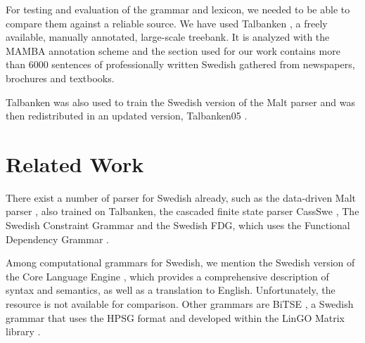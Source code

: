 \documentclass[runningheads,a4paper]{llncs}
\begin{document}
\label{sec:talbanken}
For testing and evaluation of the grammar and lexicon, we needed to be able to
compare them against a reliable source.
We have used Talbanken \cite{talbanken},
a freely available, manually annotated, large-scale treebank.
It is analyzed with the MAMBA annotation scheme and the section used for our
work contains more than 6000 sentences
of professionally written Swedish gathered from newspapers, brochures and textbooks.

Talbanken was also used to train the Swedish version of the Malt parser \cite{malt}
and was then redistributed in an updated version,
Talbanken05 \cite{talbanken05}.



 
\section{Related Work}
%
There exist a number of parser for Swedish already, such as the
data-driven Malt parser \cite{malt}, also trained on Talbanken, the 
cascaded finite state parser CassSwe \cite{casswe}, %
The Swedish Constraint Grammar \cite{birn} and the Swedish FDG, which
uses the Functional Dependency Grammar \cite{fdg}.

Among computational grammars for Swedish, we mention the Swedish
version of the Core Language Engine \cite{gamback}, which
provides a comprehensive description of syntax and semantics, as well
as a translation to English. Unfortunately, the resource is not
available for comparison. Other grammars are BiTSE \cite{stymne}, a
Swedish grammar that uses the HPSG format \cite{hpsg} and developed
within the LinGO Matrix library \cite{matrix}. 
\end{document}
